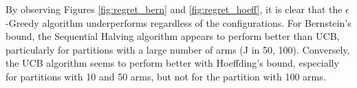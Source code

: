 By observing Figures \ref{fig:regret_bern} and \ref{fig:regret_hoeff}, it is clear that the $\epsilon$-Greedy algorithm underperforms regardless of the configurations. For Bernstein's bound, the Sequential Halving algorithm appears to perform better than UCB, particularly for partitions with a large number of arms (J in 50, 100). Conversely, the UCB algorithm seems to perform better with Hoeffding's bound, especially for partitions with 10 and 50 arms, but not for the partition with 100 arms.